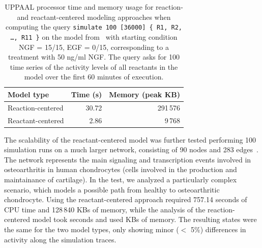\documentclass{llncs}
\begin{document}
\begin{table}
  \begin{center}
  \begin{tabular}{|l||r|r|}
    \hline
    Model type & Time (s) & Memory (peak KB) \\
    \hline
    \hline
    Reaction-centered & 30.72 & 291\,{}576 \\ %
    \hline
    Reactant-centered & 2.86 & 9\,{}768 \\ %
    \hline
  \end{tabular}
  \end{center}
  \caption{\scriptsize UPPAAL processor time and memory usage for reaction- and reactant-centered modeling approaches when computing
  the query {\tt simulate 100 [36000] \{ R1, R2, \dots, R11 \}} on the model from~\cite{animo-ieee} with starting condition
  NGF = 15/15, EGF = 0/15, corresponding to a treatment with 50 ng/ml NGF.
  The query asks for 100 time series of the activity levels of all reactants in the model over the first 60 minutes
  of execution.\label{tab:sim-100}}
\vspace{-.4cm}
\end{table}

The scalability of the reactant-centered model was further tested performing 100 simulation runs on a much larger network,
consisting of 90 nodes and 283 edges~\cite{echo-abstract}. The network represents the main signaling and transcription events
involved in osteoarthritis in human chondrocytes (cells involved in the production and
maintainance of cartilage).
In the test, we analyzed a particularly complex scenario, which models a possible path from healthy to osteoarthritic chondrocyte.
Using the reactant-centered approach required 757.14 seconds of CPU time and 128\,840 KBs of memory, while the analysis of the reaction-centered
model took  seconds and used  KBs of memory. The resulting states were the same for the two model types, only showing minor ($<$ 5\%) differences
in activity along the simulation traces.
\end{document}
